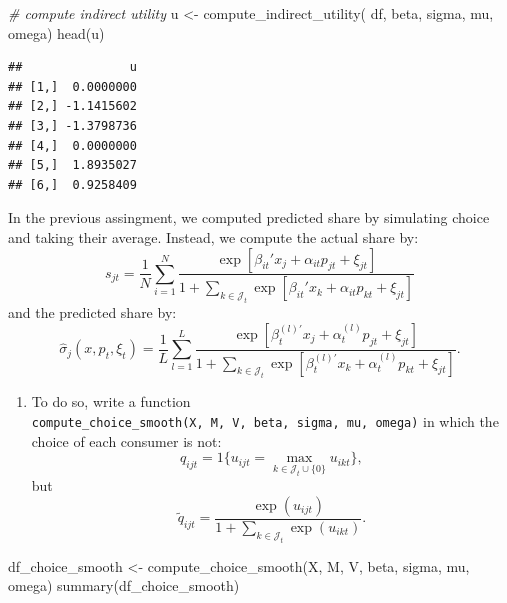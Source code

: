 \documentclass[
]{book}
\newenvironment{Shaded}{\begin{snugshade}}{\end{snugshade}}
\newcommand{\CommentTok}[1]{\textcolor[rgb]{0.56,0.35,0.01}{\textit{#1}}}
\newcommand{\FunctionTok}[1]{\textcolor[rgb]{0.00,0.00,0.00}{#1}}
\newcommand{\NormalTok}[1]{#1}
\newcommand{\OtherTok}[1]{\textcolor[rgb]{0.56,0.35,0.01}{#1}}
\providecommand{\tightlist}{%
  \setlength{\itemsep}{0pt}\setlength{\parskip}{0pt}}
\begin{document}
\begin{Shaded}
\begin{Highlighting}[]
\CommentTok{\# compute indirect utility}
\NormalTok{u }\OtherTok{\textless{}{-}} 
  \FunctionTok{compute\_indirect\_utility}\NormalTok{(}
\NormalTok{    df, beta, sigma, }
\NormalTok{           mu, omega)}
\FunctionTok{head}\NormalTok{(u)}
\end{Highlighting}
\end{Shaded}

\begin{verbatim}
##               u
## [1,]  0.0000000
## [2,] -1.1415602
## [3,] -1.3798736
## [4,]  0.0000000
## [5,]  1.8935027
## [6,]  0.9258409
\end{verbatim}

In the previous assingment, we computed predicted share by simulating choice and taking their average. Instead, we compute the actual share by:
\[
s_{jt} = \frac{1}{N} \sum_{i = 1}^N \frac{\exp[\beta_{it}' x_j + \alpha_{it} p_{jt} + \xi_{jt}]}{1 + \sum_{k \in \mathcal{J}_t} \exp[\beta_{it}' x_k + \alpha_{it} p_{kt} + \xi_{jt}]}
\]
and the predicted share by:
\[
\widehat{\sigma}_{j}(x, p_t, \xi_t) = \frac{1}{L} \sum_{l = 1}^L \frac{\exp[\beta_{t}^{(l)\prime} x_j + \alpha_{t}^{(l)} p_{jt} + \xi_{jt}]}{1 + \sum_{k \in \mathcal{J}_t} \exp[\beta_{t}^{(l)\prime} x_k + \alpha_{t}^{(l)} p_{kt} + \xi_{jt}]}.
\]

\begin{enumerate}
\def\labelenumi{\arabic{enumi}.}
\setcounter{enumi}{7}
\tightlist
\item
  To do so, write a function \texttt{compute\_choice\_smooth(X,\ M,\ V,\ beta,\ sigma,\ mu,\ omega)} in which the choice of each consumer is not:
  \[
  q_{ijt} = 1\{u_{ijt} = \max_{k \in \mathcal{J}_t \cup \{0\}} u_{ikt}\},
  \]
  but
  \[
  \tilde{q}_{ijt} = \frac{\exp(u_{ijt})}{1 + \sum_{k \in \mathcal{J}_t} \exp(u_{ikt})}.
  \]
\end{enumerate}

\begin{Shaded}
\begin{Highlighting}[]
\NormalTok{df\_choice\_smooth }\OtherTok{\textless{}{-}}
  \FunctionTok{compute\_choice\_smooth}\NormalTok{(X, M, V, beta, sigma, mu, omega)}
\FunctionTok{summary}\NormalTok{(df\_choice\_smooth)}
\end{Highlighting}
\end{Shaded}
\end{document}
